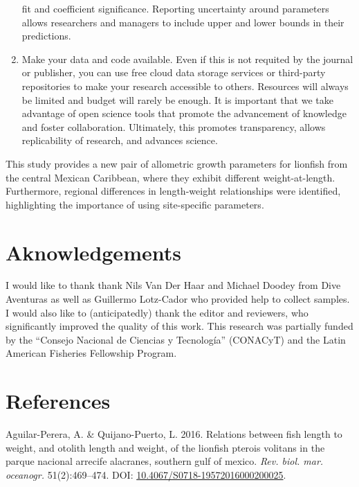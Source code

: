\documentclass[12pt,]{article}
\begin{document}
\begin{enumerate}
  fit and coefficient significance. Reporting uncertainty around
  parameters allows researchers and managers to include upper and lower
  bounds in their predictions.
\item
  Make your data and code available. Even if this is not requited by the
  journal or publisher, you can use free cloud data storage services or
  third-party repositories to make your research accessible to others.
  Resources will always be limited and budget will rarely be enough. It
  is important that we take advantage of open science tools that promote
  the advancement of knowledge and foster collaboration. Ultimately,
  this promotes transparency, allows replicability of research, and
  advances science.
\end{enumerate}

This study provides a new pair of allometric growth parameters for
lionfish from the central Mexican Caribbean, where they exhibit
different weight-at-length. Furthermore, regional differences in
length-weight relationships were identified, highlighting the importance
of using site-specific parameters.

\section{Aknowledgements}\label{aknowledgements}

I would like to thank thank Nils Van Der Haar and Michael Doodey from
Dive Aventuras as well as Guillermo Lotz-Cador who provided help to
collect samples. I would also like to (anticipatedly) thank the editor
and reviewers, who significantly improved the quality of this work. This
research was partially funded by the ``Consejo Nacional de Ciencias y
Tecnología'' (CONACyT) and the Latin American Fisheries Fellowship
Program.

\section*{References}\label{references}

\hypertarget{refs}{}
\hypertarget{ref-aguilarperera_2016}{}
Aguilar-Perera, A. \& Quijano-Puerto, L. 2016. Relations between fish
length to weight, and otolith length and weight, of the lionfish pterois
volitans in the parque nacional arrecife alacranes, southern gulf of
mexico. \emph{Rev. biol. mar. oceanogr.} 51(2):469--474. DOI:
\href{https://doi.org/10.4067/S0718-19572016000200025}{10.4067/S0718-19572016000200025}.
\end{document}
